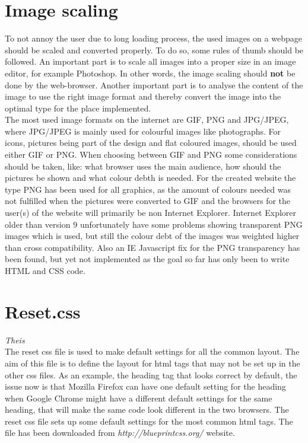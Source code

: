 \section{Image scaling}
To not annoy the user due to long loading process, the used images on a webpage should be scaled and converted properly. To do so, some rules of thumb should be followed. An important part is to scale all images into a proper size in an image editor, for example Photoshop. In other words, the image scaling should \textbf{not} be done by the web-browser. Another important part is to analyse the content of the image to use the right image format and thereby convert the image into the optimal type for the place implemented.
\\The most used image formats on the internet are GIF, PNG and JPG/JPEG, where JPG/JPEG is mainly used for colourful images like photographs. For icons, pictures being part of the design and flat coloured images, should be used either GIF or PNG. When choosing between GIF and PNG some considerations should be taken, like: what browser uses the main audience, how should the pictures be shown and what colour debth is needed. For the created website the type PNG has been used for all graphics, as the amount of colours needed was not fulfilled when the pictures were converted to GIF and the browsers for the user(s) of the website will primarily be non Internet Explorer. Internet Explorer older than version 9 unfortunately have some problems showing transparent PNG images which is used, but still the colour debt of the images was weighted higher than cross compatibility. Also an IE Javascript fix for the PNG transparency has been found, but yet not implemented as the goal so far has only been to write HTML and CSS code. 

\section{Reset.css} \textit{Theis}\\
The reset css file is used to make default settings for all the common layout. The aim of this file is to define the layout for html tags that may not be set up in the other css files. As an example, the heading tag that looks correct by default, the issue now is that Mozilla Firefox can have one default setting for the heading when Google Chrome might have a different default settings for the same heading, that will make the same code look different in the two browsers. The reset css file sets up some default settings for the most common html tags. The file has been downloaded from \textit{http://blueprintcss.org/} website.
